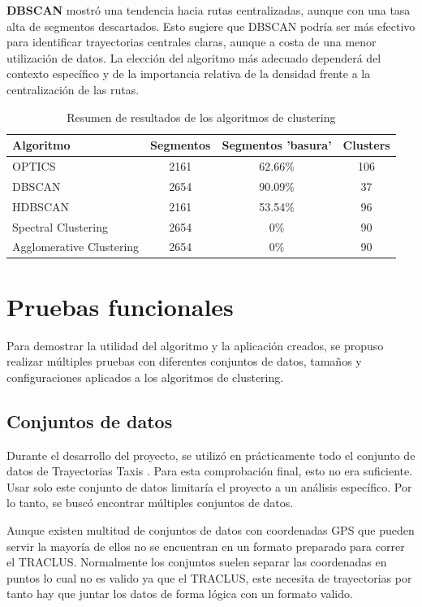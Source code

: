 \textbf{DBSCAN} mostró una tendencia hacia rutas centralizadas, aunque con una tasa alta de segmentos descartados. Esto sugiere que DBSCAN podría ser más efectivo para identificar trayectorias centrales claras, aunque a costa de una menor utilización de datos. La elección del algoritmo más adecuado dependerá del contexto específico y de la importancia relativa de la densidad frente a la centralización de las rutas.

\begin{table}[ht]
\centering
\begin{tabular}{|p{3.0cm}||c|c|c|}
\hline
\textbf{Algoritmo} & \textbf{Segmentos} & \textbf{Segmentos 'basura'} & \textbf{Clusters}  \\
\hline
OPTICS & 2161 & 62.66\% & 106 \\
DBSCAN & 2654 & 90.09\% & 37 \\
HDBSCAN & 2161 & 53.54\% & 96 \\
Spectral Clustering & 2654 & 0\% & 90 \\
Agglomerative Clustering & 2654 & 0\% & 90 \\
\hline
\end{tabular}
\caption{Resumen de resultados de los algoritmos de clustering}
\label{tabla:comparacion_algoritmos}
\end{table}



\section{Pruebas funcionales}

Para demostrar la utilidad del algoritmo y la aplicación creados, se propuso realizar múltiples pruebas con diferentes conjuntos de datos, tamaños y configuraciones aplicados a los algoritmos de clustering.

\subsection{Conjuntos de datos}

Durante el desarrollo del proyecto, se utilizó en prácticamente todo el conjunto de datos de Trayectorias Taxis \cite{trayectorias_taxis}. Para esta comprobación final, esto no era suficiente. Usar solo este conjunto de datos limitaría el proyecto a un análisis específico. Por lo tanto, se buscó encontrar múltiples conjuntos de datos.

Aunque existen multitud de conjuntos de datos con coordenadas GPS que pueden servir la mayoría de ellos no se encuentran en un formato preparado para correr el TRACLUS. Normalmente los conjuntos suelen separar las coordenadas en puntos lo cual no es valido ya que el TRACLUS, este necesita de trayectorias por tanto hay que juntar los datos de forma lógica con un formato valido. 

